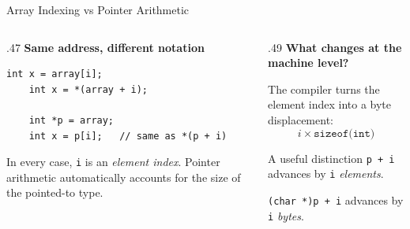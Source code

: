 \documentclass[9pt,aspectratio=169,xcolor=table]{beamer}
\begin{document}
\begin{frame}[fragile]{Array Indexing vs Pointer Arithmetic}
	\begin{columns}[T]
		\begin{column}{.47\textwidth}
			\textbf{Same address, different notation}
			\begin{lstlisting}[style=myc]
	int x = array[i];
	int x = *(array + i);

	int *p = array;
	int x = p[i];   // same as *(p + i)
			\end{lstlisting}

			\vspace{2mm}
			{\small
				In every case, \texttt{i} is an \emph{element index}.
				Pointer arithmetic automatically accounts for the size
				of the pointed-to type.
			}
		\end{column}

		\begin{column}{.49\textwidth}
			\textbf{What changes at the machine level?}

			\vspace{1mm}
			{\small
				The compiler turns the element index into a byte
				displacement:
				\[
				i \times \texttt{sizeof(int)}
				\]
			}

			\vspace{2mm}

			\begin{block}{A useful distinction}
				\small
				\texttt{p + i} advances by \texttt{i} \emph{elements}.

				\vspace{1mm}

				\texttt{(char *)p + i} advances by \texttt{i} \emph{bytes}.
			\end{block}
		\end{column}
	\end{columns}

\end{frame}
\end{document}
